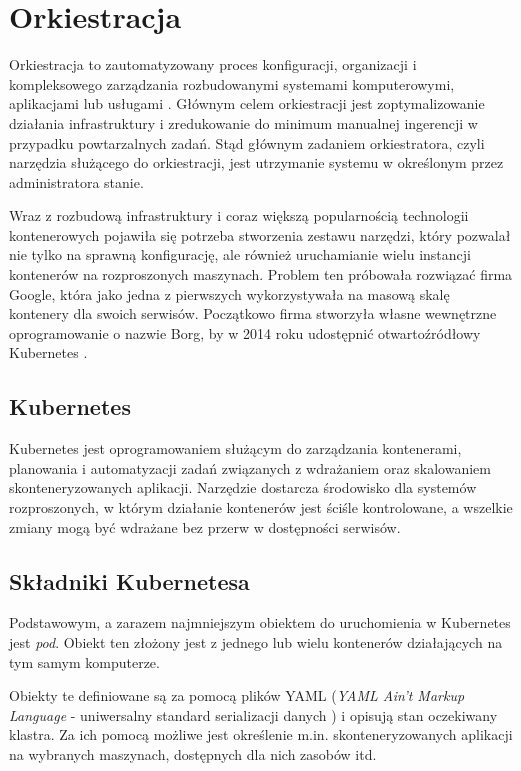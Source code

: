

\chapter{Orkiestracja}

Orkiestracja to zautomatyzowany proces konfiguracji, organizacji i kompleksowego zarządzania rozbudowanymi systemami komputerowymi, aplikacjami lub usługami \cite{arundel}. Głównym celem orkiestracji jest zoptymalizowanie działania infrastruktury i zredukowanie do minimum manualnej ingerencji w przypadku powtarzalnych zadań. Stąd głównym zadaniem orkiestratora, czyli narzędzia służącego do orkiestracji, jest utrzymanie systemu w określonym przez administratora stanie.  

Wraz z rozbudową infrastruktury i coraz większą popularnością technologii kontenerowych pojawiła się potrzeba stworzenia zestawu narzędzi, który pozwalał nie tylko na sprawną konfigurację, ale również uruchamianie wielu instancji kontenerów na rozproszonych maszynach. Problem ten próbowała rozwiązać firma Google, która jako jedna z pierwszych wykorzystywała na masową skalę kontenery dla swoich serwisów. Początkowo firma stworzyła własne wewnętrzne oprogramowanie o nazwie Borg, by w 2014 roku udostępnić otwartoźródłowy Kubernetes \cite{kubernetes}.

\section{Kubernetes} 

Kubernetes jest oprogramowaniem służącym do zarządzania kontenerami, planowania i automatyzacji zadań związanych z wdrażaniem oraz skalowaniem skonteneryzowanych aplikacji. Narzędzie dostarcza środowisko dla systemów rozproszonych, w którym działanie kontenerów jest ściśle kontrolowane, a wszelkie zmiany mogą być wdrażane bez przerw w dostępności serwisów. 
\newpage

\section{Składniki Kubernetesa}

Podstawowym, a zarazem najmniejszym obiektem do uruchomienia w Kubernetes jest \textit{pod}. Obiekt ten złożony jest z jednego lub wielu kontenerów działających na tym samym komputerze. 

Obiekty te definiowane są za pomocą plików YAML (\textit{YAML Ain’t Markup Language} - uniwersalny standard serializacji danych \cite{yaml}) i opisują stan oczekiwany klastra. Za ich pomocą możliwe jest określenie m.in. skonteneryzowanych aplikacji na wybranych maszynach, dostępnych dla nich zasobów itd.  


